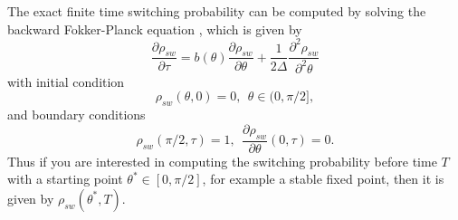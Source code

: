 \documentclass[journal,transmag]{IEEEtran}
\begin{document}
The exact finite time switching probability can be computed by solving the backward Fokker-Planck equation \cite{gardiner2004handbook}, which is given by 
\begin{equation} \label{bfp:1}
\frac{\partial \rho_{sw}}{\partial \tau}  
=  b(\theta)\frac{\partial  \rho_{sw} }{\partial \theta} +  \frac{1}{2 \Delta}  \frac{\partial^2  \rho_{sw}}{\partial^2 \theta}
\end{equation}
with initial condition 
\begin{equation}
\rho_{sw}(\theta,0) = 0 , \ \ \theta \in (0,\pi/2],
\end{equation}
and boundary conditions 
\begin{equation}
\rho_{sw}(\pi/2,\tau) = 1, \   \  \frac{\partial \rho_{sw}}{\partial \theta}(0,\tau)  = 0. 
\end{equation}
Thus if you are interested in computing the switching probability before time $T$ with a starting point $\theta^* \in [0,\pi/2]$, for example a stable fixed point, then it is given by  $\rho_{sw}(\theta^*,T).$
\end{document}
